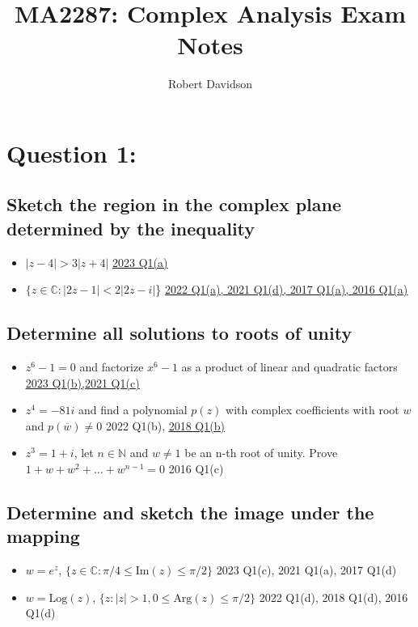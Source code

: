 \documentclass[a4paper, 8pt]{extarticle}
\title{
\textbf{MA2287: Complex Analysis Exam Notes} \\ 
}
\author{
  Robert Davidson
}
\date{} %
\begin{document}
\maketitle
\pagebreak
\tableofcontents
\pagebreak


\section{Question 1: }
\subsection{Sketch the region in the complex plane determined by the inequality}
\begin{itemize}
    \item $|z - 4| > 3|z+4|$ \hfill \hyperref[sol:2023Q1a]{\uline{2023 Q1(a)}}
    \item $\{ z \in \mathbb{C} : |2z - 1| < 2|2z-i|$\} \hfill  \hyperref[sol:2022Q1a]{\uline{2022 Q1(a), 2021 Q1(d), 2017 Q1(a), 2016 Q1(a)}}
\end{itemize}
\subsection{Determine all solutions to roots of unity}
\begin{itemize}
    \item $z^6 -1 = 0$ and factorize $x^6 -1$ as a product of linear and quadratic factors \hfill \hyperref[sol:2023Q1b]{\uline{2023 Q1(b),2021 Q1(c)}}
    \item $z^4 = -81i$ and find a polynomial $p(z)$ with complex coefficients with root $w$ and $p(\overline{w}) \neq 0$ \hfill 2022 Q1(b), \hyperref[sol:20188Q1b]{\uline{2018 Q1(b)}}
    \item $z^3 = 1+i$, let $n \in \mathbb{N}$ and $w \neq 1$ be an n-th root of unity. Prove $1 + w + w^2 + \ldots + w^{n-1} = 0$ \hfill 2016 Q1(c)
\end{itemize}
\subsection{Determine and sketch the image under the mapping}
\begin{itemize}
    \item $w = e^z$, $\{z \in \mathbb{C} : \pi / 4 \leq \text{Im}(z) \leq \pi /2\}$ \hfill 2023 Q1(c), 2021 Q1(a), 2017 Q1(d)
    \item $w = \text{Log}(z)$, $\{z: |z| > 1, 0 \leq \text{Arg}(z) \leq \pi / 2\}$ \hfill 2022 Q1(d), 2018 Q1(d), 2016 Q1(d)
\end{itemize}
\end{document}
